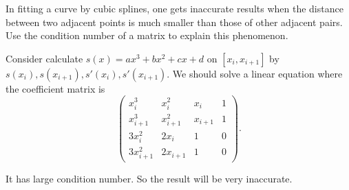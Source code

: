 \documentclass[11pt]{elegantbook}
\begin{document}
\vspace{1em}

\begin{problem}
  In fitting a curve by cubic splines, one gets inaccurate results when the distance between two adjacent points is much smaller than those of other adjacent pairs. Use the condition number of a matrix to explain this phenomenon.
\end{problem}

\begin{solution}
  Consider calculate $s(x)=ax^3+bx^2+cx+d$ on $[x_i,x_{i+1}]$ by $s(x_i),s(x_{i+1}),s'(x_i),s'(x_{i+1})$. We should solve a linear equation where the coefficient matrix is
  \begin{equation*}
    \begin{pmatrix}
      x_i^3 & x_i^2 & x_i & 1\\
      x_{i+1}^3 & x_{i+1} ^2 & x_{i+1} & 1\\
      3x_i^2 & 2x_i & 1 & 0\\
      3x_{i+1}^2 & 2x_{i+1} & 1 & 0
    \end{pmatrix}.
  \end{equation*}

  It has large condition number. So the result will be very inaccurate.
\end{solution}
\end{document}
